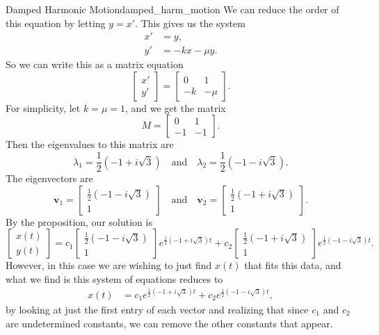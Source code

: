 \begin{ex}{Damped Harmonic Motion}{damped_harm_motion}
        We can reduce the order of this equation by letting $y=x'$.  This gives us the system
        \begin{align*}
        x' &= y,\\
        y' &= -kx -\mu y.
        \end{align*}
        So we can write this as a matrix equation
        \[
        \begin{bmatrix} x' \\ y' \end{bmatrix} = \begin{bmatrix} 0 & 1 \\ -k & -\mu \end{bmatrix}.
        \]
        For simplicity, let $k=\mu=1$, and we get the matrix
        \[
        M = \begin{bmatrix} 0 & 1 \\ - 1& - 1 \end{bmatrix}.
        \]
        Then the eigenvalues to this matrix are
        \[
        \lambda_1 = \frac{1}{2}(-1+i\sqrt{3})\quad \textrm{and} \quad \lambda_2 = \frac{1}{2}(-1-i\sqrt{3}).
        \]
        The eigenvectors are
        \[
        \mathbf{v}_1 = \begin{bmatrix} \frac{1}{2} (-1-i\sqrt{3}) \\ 1 \end{bmatrix} \quad \textrm{and} \quad \mathbf{v}_2 = \begin{bmatrix} \frac{1}{2} (-1+i\sqrt{3}) \\ 1 \end{bmatrix}.
        \]
        By the proposition, our solution is
        \[
        \begin{bmatrix} x(t) \\ y(t) \end{bmatrix} = c_1 \begin{bmatrix} \frac{1}{2} (-1-i\sqrt{3}) \\ 1 \end{bmatrix} e^{\frac{1}{2}(-1+i\sqrt{3})t}+c_2  \begin{bmatrix} \frac{1}{2} (-1+i\sqrt{3}) \\ 1 \end{bmatrix} e^{\frac{1}{2}(-1-i\sqrt{3})t}.
        \]
        However, in this case we are wishing to just find $x(t)$ that fits this data, and what we find is this system of equations reduces to
        \begin{align*}
        x(t) &= c_1 e^{\frac{1}{2}(-1+i\sqrt{3})t}+c_2 e^{\frac{1}{2}(-1-i\sqrt{3})t},
        \end{align*}
        by looking at just the first entry of each vector and realizing that since $c_1$ and $c_2$ are undetermined constants, we can remove the other constants that appear.
        

\end{ex}
